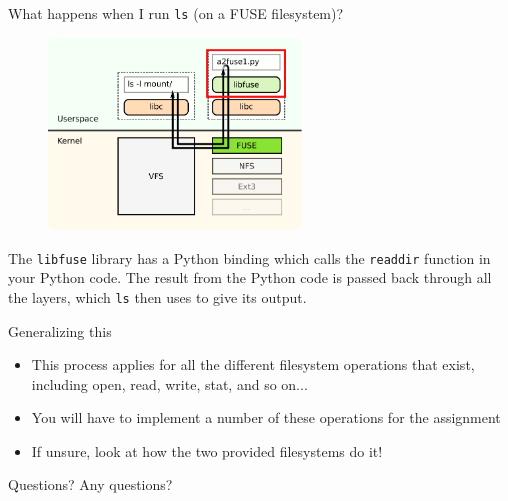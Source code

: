 \documentclass[notes]{beamer}
\begin{document}
\begin{frame}{What happens when I run \texttt{ls} (on a FUSE filesystem)?}
    \begin{figure}
        \centering
        \includegraphics[width=0.6\textwidth]{FUSE_structure_libfuse.pdf}
    \end{figure}
    The \texttt{libfuse} library has a Python binding which calls the \texttt{readdir} function in your Python code. The result from the Python code is passed back through all the layers, which \texttt{ls} then uses to give its output.
\end{frame}
\begin{frame}{Generalizing this}
    \begin{itemize}
        \item This process applies for all the different filesystem operations that exist, including open, read, write, stat, and so on...
        \item You will have to implement a number of these operations for the assignment
        \item If unsure, look at how the two provided filesystems do it!
    \end{itemize}
\end{frame}
\begin{frame}{Questions?}
    Any questions?
\end{frame}
\end{document}
